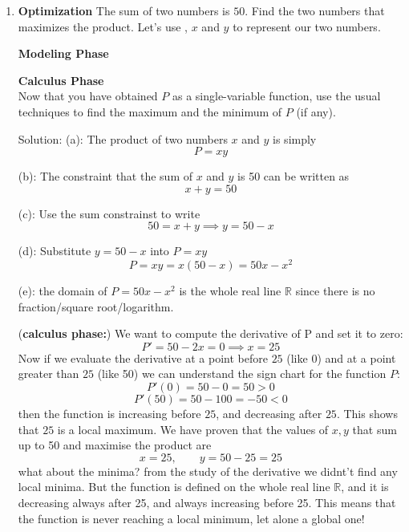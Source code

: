 \documentclass[10pt]{article}
\begin{document}
\begin{enumerate}
\newpage
\item {\bf Optimization} The sum of two numbers is $50$. Find the two numbers that maximizes the product. Let's use , $x$ and $y$ to represent our two numbers.

{\bf Modeling Phase}


{\bf Calculus Phase}
\\ Now that you have obtained $P$ as a single-variable function, use the usual techniques to find the maximum and the minimum of $P$ (if any). 



Solution: (a): The product of two numbers $x$ and $y$ is simply 
\[
P=xy
\]

(b): The constraint that the sum of $x$ and $y$ is 50 can be written as
\[
x+y=50
\]


(c): Use the sum constrainst to write
\[
50=x+y \implies y=50-x
\]


(d): Substitute $y=50-x$ into $P=xy$
\[
P=xy=x(50-x)=50x-x^2
\]


(e): the domain of $P=50x-x^2$ is the whole real line $\mathbb{R}$ since there is no fraction/square root/logarithm.  


({\bf calculus phase:}) We want to compute the derivative of P and set it to zero:
\[
P'=50-2x=0 \implies x=25
\]
Now if we evaluate the derivative at a point before $25$ (like 0) and at a point greater than $25$ (like 50) we can understand the sign chart for the function $P$:
\[
P'(0)=50-0=50>0
\]
\[
P'(50)=50-100=-50 <0
\]
then the function is increasing before $25$, and decreasing after $25$. This shows that $25$ is a local maximum. We have proven that the values of $x,y$ that sum up to 50 and maximise the product are 
\[
x=25, \qquad y=50-25=25
\]
what about the minima? from the study of the derivative we didnt't find any local minima. But the function is defined on the whole real line $\mathbb{R}$, and it is decreasing always after 25, and always increasing before 25. This means that the function is never reaching a local minimum, let alone a global one! 






\end{enumerate}
\end{document}
